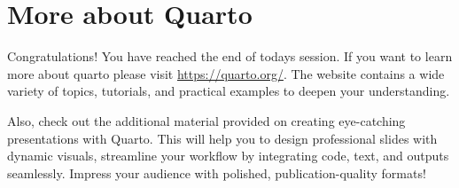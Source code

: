 \documentclass[
  letterpaper,
  DIV=11,
  numbers=noendperiod]{scrartcl}
\begin{document}
\section{More about Quarto}\label{more-about-quarto}

Congratulations! You have reached the end of today\textquotesingle s
session. If you want to learn more about quarto please visit
\url{https://quarto.org/}. The website contains a wide variety of
topics, tutorials, and practical examples to deepen your understanding.

Also, check out the additional material provided on creating
eye-catching presentations with Quarto. This will help you to design
professional slides with dynamic visuals, streamline your workflow by
integrating code, text, and outputs seamlessly. Impress your audience
with polished, publication-quality formats!
\end{document}
